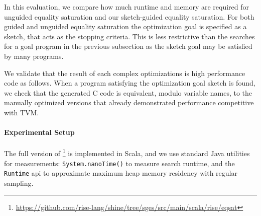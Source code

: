 In this evaluation, we compare how much runtime and memory are required for unguided equality saturation and our sketch-guided equality saturation.
For both guided and unguided equality saturation the optimization goal is specified as a sketch, that acts as the stopping criteria.
This is less restrictive than the searches for a goal program in the previous subsection as the sketch goal may be satisfied by many programs.

We validate that the result of each complex optimizations is high performance code as follows.
When a program satisfying the optimization goal sketch is found, we check that the generated C code is equivalent, modulo variable names, to the manually optimized versions that already demonstrated performance competitive with TVM.


\paragraph{Experimental Setup}
The full version of \kles{}\footnote{\url{https://github.com/rise-lang/shine/tree/sges/src/main/scala/rise/eqsat}} is implemented in Scala, and we use standard Java utilities for measurements: \texttt{System.nanoTime()} to measure search runtime, and the \texttt{Runtime} api to approximate maximum heap memory residency with regular  sampling.

